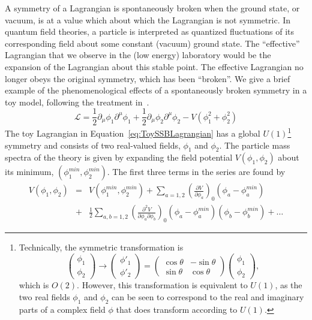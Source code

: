 A symmetry of a Lagrangian is spontaneously broken when the ground state, or
vacuum, is at a value which about which the Lagrangian is not symmetric.  In
quantum field theories, a particle is interpreted as quantized fluctuations of
its corresponding field about some constant (vacuum) ground state.  The
``effective'' Lagrangian that we observe in the (low energy) laboratory would be
the expansion of the Lagrangian about this stable point.  The effective
Lagrangian no longer obeys the original symmetry, which has been ``broken''.  We
give a brief example of the phenomenological effects of a spontaneously broken
symmetry in a toy model, following the treatment in~\cite{Morii:SMandBSM}.
\begin{equation}
  \mathcal{L} = 
  \frac{1}{2}\partial_\mu\phi_1\partial^\mu\phi_1 + 
  \frac{1}{2}\partial_\mu\phi_2\partial^\mu\phi_2 -
  V(\phi_1^2 + \phi_2^2)
  \label{eq:ToySSBLagrangian}
\end{equation}
The toy Lagrangian in Equation~\ref{eq:ToySSBLagrangian} has a global
$U(1)$\footnote{Technically, the symmetric transformation is 
\begin{equation}
  \left(\begin{array}{c} \phi_1 \\ \phi_2 \end{array}\right)
    \to
  \left(\begin{array}{c} \phi'_1 \\ \phi'_2 \end{array}\right)
    =
  \left(\begin{array}{cc} \cos\theta & -\sin\theta \\ 
    \sin\theta & \cos\theta \end{array}\right)
  \left(\begin{array}{c} \phi_1 \\ \phi_2 \end{array}\right),
    \nonumber
\end{equation} which is $O(2)$.  However, this transformation is equivalent to 
$U(1)$, as the two real fields $\phi_1$ and $\phi_2$ can be seen to correspond
to the real and imaginary parts of a complex field $\phi$ that does transform
according to $U(1)$.} symmetry and consists of two real-valued fields, $\phi_1$
and $\phi_2$.  The particle mass spectra of the theory is given by expanding the
field potential $V(\phi_1, \phi_2)$ about its minimum, $(\phi^{min}_1,
\phi^{min}_2)$.  The first three terms in the series are found by
\begin{eqnarray}
  V(\phi_1, \phi_2) &= &V(\phi^{min}_1, \phi^{min}_2) + 
  \sum_{a=1,2} \left(\frac {\partial V}{\partial \phi_a}\right)_{0} (\phi_a -
  \phi^{min}_a) \\
  &+ &\frac{1}{2} \sum_{a,b=1,2} \left(\frac {\partial^2 V}{\partial \phi_a \partial
  \phi_b}\right)_{0} (\phi_a - \phi^{min}_a)(\phi_b - \phi^{min}_b) + \ldots
  \label{eq:ExpandedPotential}
\end{eqnarray}
